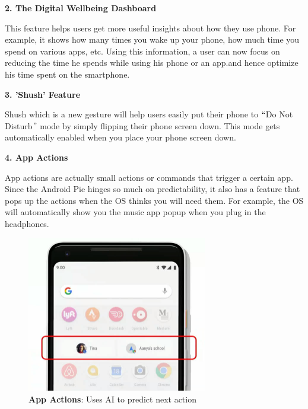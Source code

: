 \documentclass[12pt]{article}
\begin{document}
\textbf{\textcolor[HTML]{4A4A4A}{2. The Digital Wellbeing Dashboard}}\par

\textcolor[HTML]{4A4A4A}{This feature helps users get more useful insights about how they use phone. For example, it shows how many times you wake up your phone, how much time you spend on various apps, etc. Using this information, a user can now focus on reducing the time he spends while using his phone or an app.and hence optimize his time spent on the smartphone.}\par

\textbf{\textcolor[HTML]{4A4A4A}{3. 'Shush' Feature}}\par

\textcolor[HTML]{4A4A4A}{Shush which is a new gesture will help users easily put their phone to $``$Do Not Disturb$"$  mode by simply flipping their phone screen down. This mode gets automatically enabled when you place your phone screen down.}\par

\textbf{\textcolor[HTML]{4A4A4A}{4. App Actions}}\par

\textcolor[HTML]{4A4A4A}{App actions are actually small actions or commands that trigger a certain app. Since the Android Pie hinges so much on predictability, it also has a feature that pops up the actions when the OS thinks you will need them. For example, the OS will automatically show you the music app popup when you plug in the headphones.}\par

\begin{figure}[t]
\begin{center}
\centering

\includegraphics[trim ={0.75cm 0.75cm 0.75cm 0.75cm}, width=0.7\textwidth]{AppAction}\vspace{2mm}
\caption{\textbf{App Actions}: Uses AI to predict next action}
\end{center}
\end{figure}
\end{document}
